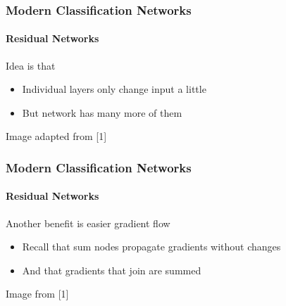 \documentclass[xetex,professionalfont]{beamer}
\begin{document}
\begin{frame}
	\frametitle{Modern Classification Networks}
	\framesubtitle{Residual Networks}

	Idea is that
	\begin{itemize}
		\item Individual layers only change input a little
		\item But network has many more of them
	\end{itemize}

	\begin{center}
		{\centering Image adapted from [1]}
	\end{center}

\end{frame}



\begin{frame}
	\frametitle{Modern Classification Networks}
	\framesubtitle{Residual Networks}

	Another benefit is easier gradient flow
	\begin{itemize}
		\item Recall that sum nodes propagate gradients without changes %
		\item And that gradients that join are summed %
	\end{itemize}

	\medskip

	\begin{center}
		{\centering Image from [1]}
	\end{center}

\end{frame}
\end{document}
